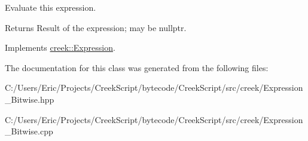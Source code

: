 Evaluate this expression. 

\begin{DoxyReturn}{Returns}
Result of the expression; may be {\ttfamily nullptr}. 
\end{DoxyReturn}


Implements \hyperlink{classcreek_1_1_expression_a3c7fe4a04e24c8d907f918240e2bf43d}{creek\+::\+Expression}.



The documentation for this class was generated from the following files\+:\begin{DoxyCompactItemize}
\item 
C\+:/\+Users/\+Eric/\+Projects/\+Creek\+Script/bytecode/\+Creek\+Script/src/creek/Expression\+\_\+\+Bitwise.\+hpp\item 
C\+:/\+Users/\+Eric/\+Projects/\+Creek\+Script/bytecode/\+Creek\+Script/src/creek/Expression\+\_\+\+Bitwise.\+cpp\end{DoxyCompactItemize}
